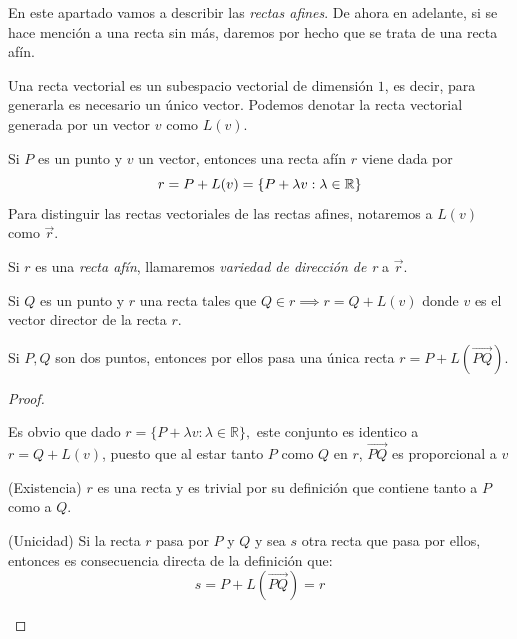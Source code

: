 En este apartado vamos a describir las \textit{rectas afines}. De ahora en adelante, si se hace mención a una recta sin más, daremos por hecho que se trata de una recta afín.

\begin{ndef}
  Una recta vectorial es un subespacio vectorial de dimensión $1$, es decir, para generarla es necesario un único vector. Podemos denotar la recta vectorial generada por un vector $v$ como $L(v)$.
\end{ndef}

\begin{ndef}
  Si $P$ es un punto y $v$ un vector, entonces una recta afín $r$ viene dada por
  \[
    r = P+L(v) = \{P + \lambda v : \lambda \in \mathbb{R}\}
  \]
  Para distinguir las rectas vectoriales de las rectas afines, notaremos a $L(v)$ como $\vec{r}$.
\end{ndef}

\begin{ndef}
  Si $r$ es una \textit{recta afín}, llamaremos \textit{variedad de dirección de r} a $\vec{r}$.
\end{ndef}

\begin{nprop}\hfill
\begin{nlist}
\item Si $Q$ es un punto y $r$ una recta tales que $Q\in r \implies r = Q +L(v)$ donde $v$ es el vector director de la recta $r$.
\item Si $P,Q$ son dos puntos, entonces por ellos pasa una única recta $r = P +L(\overrightarrow{PQ})$. \\

\end{nlist}
\end{nprop}

 \begin{proof} \hfill

 \begin{nlist}
	\item Es obvio que dado $r = \{P+\lambda v : \lambda \in \mathbb{R}\},$ este conjunto es identico a $r = Q +L(v)$, puesto que al estar tanto $P$ como $Q$ en $r$, $\vec{PQ}$ es proporcional a $v$

\item (Existencia) $r$ es una recta y es trivial por su definición que contiene tanto a $P$ como a $Q$.

    (Unicidad) Si la recta $r$ pasa por $P$ y $Q$ y sea $s$ otra recta que pasa por ellos, entonces es consecuencia directa de la definición que:
    \[
      s = P+L(\overrightarrow{PQ}) = r
    \]


\end{nlist}
  \end{proof}

